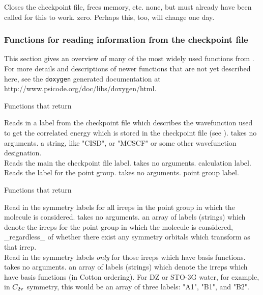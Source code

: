 \noindent {} 
{Closes the checkpoint file, frees memory, etc.}
{none, but  must already have been called for
this to work.}
{zero.  Perhaps this, too, will change one day.}

\subsubsection{Functions for reading information from the checkpoint file}
This section gives an overview of many of the most widely used
functions from .  For more details and
descriptions of newer functions that are not yet described here, see
the {\tt doxygen} generated documentation at \\
{http://www.psicode.org/doc/libs/doxygen/html}.

\begin{center}
Functions that return 
\end{center}
{Reads in a label from the checkpoint file which describes the
wavefunction used to get the correlated energy which is stored in
the checkpoint file (see ).}
{takes no arguments.}
{a string, like "CISD", or "MCSCF" or
some other wavefunction designation.}\\

\noindent {}
{Reads the main the checkpoint file label.}
{takes no arguments.}
{calculation label.} \\

\noindent {}
{Reads the label for the point group.}
{takes no arguments.}
{point group label.}

\begin{center}
Functions that return 
\end{center}
\noindent {} 
{Read in the symmetry labels for all irreps in the
point group in which the molecule is considered.}
{takes no arguments.}
{an array of labels (strings) which denote
the irreps for the point group  in which the molecule is considered,
\_regardless\_ of whether there exist any symmetry orbitals which
transform as that irrep.} \\

\noindent {}
{Read in the symmetry labels {\em only} for those irreps
which have basis functions.}
{takes no arguments.}
{an array of labels (strings) which denote
the irreps which have basis functions (in Cotton ordering).  For DZ or
STO-3G water, for example, in $C_{\rm 2v}$ symmetry, this would be an array of
three labels: "A1", "B1", and "B2".}

